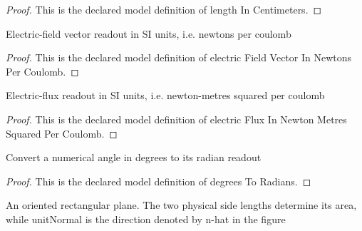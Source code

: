 \begin{proof}
  This is the declared model definition of length In Centimeters.
\end{proof}
\begin{definition}
  \label{def:physics:phyx-mini-0843:phyxminiproblems-problemphyxmini0843-electricfieldvectorinnewtonspercoulomb}
  Electric-field vector readout in SI units, i.e. newtons per coulomb
\end{definition}
\begin{proof}
  This is the declared model definition of electric Field Vector In Newtons Per Coulomb.
\end{proof}
\begin{definition}
  \label{def:physics:phyx-mini-0843:phyxminiproblems-problemphyxmini0843-electricfluxinnewtonmetressquaredpercoulomb}
  Electric-flux readout in SI units, i.e. newton-metres squared per coulomb
\end{definition}
\begin{proof}
  This is the declared model definition of electric Flux In Newton Metres Squared Per Coulomb.
\end{proof}
\begin{definition}
  \label{def:physics:phyx-mini-0843:phyxminiproblems-problemphyxmini0843-degreestoradians}
  Convert a numerical angle in degrees to its radian readout
\end{definition}
\begin{proof}
  This is the declared model definition of degrees To Radians.
\end{proof}
\begin{definition}
  \label{def:physics:phyx-mini-0843:phyxminiproblems-problemphyxmini0843-orientedrectangularsurface}
  An oriented rectangular plane. The two physical side lengths determine its area, while unitNormal is the direction denoted by n-hat in the figure
\end{definition}
